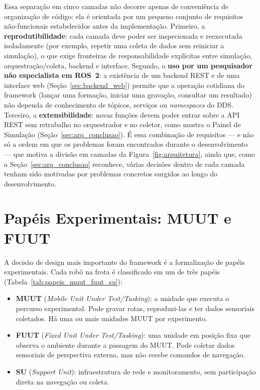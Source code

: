 Essa separação em cinco camadas não decorre apenas de conveniência de
organização de código: ela é orientada por um pequeno conjunto de requisitos
não-funcionais estabelecidos antes da implementação. Primeiro, a
\textbf{reprodutibilidade}: cada camada deve poder ser inspecionada e
reexecutada isoladamente (por exemplo, repetir uma coleta de dados sem
reiniciar a simulação), o que exige fronteiras de responsabilidade explícitas
entre simulação, orquestração/coleta, backend e interface. Segundo, o
\textbf{uso por um pesquisador não especialista em ROS~2}: a existência de
um backend REST e de uma interface web (Seção~\ref{sec:backend_web}) permite
que a operação cotidiana do framework (lançar uma formação, iniciar uma
gravação, consultar um resultado) não dependa de conhecimento de tópicos,
serviços ou \textit{namespaces} do DDS. Terceiro, a \textbf{extensibilidade}: novas funções devem poder entrar sobre
a API REST sem retrabalho no orquestrador e no coletor, como mostra o Painel de
Simulação (Seção~\ref{sec:arq_conclusao}). É essa
combinação de requisitos --- e não só a ordem em que os problemas foram
encontrados durante o desenvolvimento --- que motiva a divisão em camadas
da Figura~\ref{fig:arquitetura}, ainda que, como a Seção~\ref{sec:arq_conclusao}
reconhece, várias decisões dentro de cada camada tenham sido motivadas por
problemas concretos surgidos ao longo do desenvolvimento.

\section{Papéis Experimentais: MUUT e FUUT}
\label{sec:papeis}

A decisão de design mais importante do framework é a formalização de papéis
experimentais. Cada robô na frota é classificado em um de três papéis (Tabela~\ref{tab:papeis_muut_fuut_su}):

\begin{itemize}
    \item \textbf{MUUT} (\textit{Mobile Unit Under Test/Tasking}): a unidade que
    executa o percurso experimental. Pode gravar rotas, reproduzi-las e ter dados
    sensoriais coletados. Há uma ou mais unidades MUUT por experimento.

    \item \textbf{FUUT} (\textit{Fixed Unit Under Test/Tasking}): uma unidade em
    posição fixa que observa o ambiente durante a passagem do MUUT. Pode coletar
    dados sensoriais de perspectiva externa, mas não recebe comandos de navegação.

    \item \textbf{SU} (\textit{Support Unit}): infraestrutura de rede e monitoramento,
    sem participação direta na navegação ou coleta.
\end{itemize}

